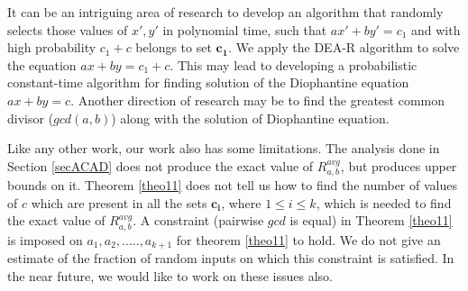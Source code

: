 \documentclass[pdflatex,sn-mathphys-num]{sn-jnl}%
\theoremstyle{thmstyleone}%
\theoremstyle{thmstyletwo}%
\theoremstyle{thmstylethree}%
\begin{document}
 \par It can be an intriguing area of research to develop an algorithm that randomly selects those values of $x',y'$ in polynomial time, such that $ax'+by'=c_1$ and with high probability $c_1+c$ belongs to set $\mathbf{c_1}$. We apply the DEA-R algorithm to solve the equation $ax+by=c_1+c$. This may lead to developing a probabilistic constant-time algorithm for finding solution of the Diophantine equation $ax+by=c$. Another direction of research may be to find the greatest common divisor ($gcd(a,b)$) along with the solution of  Diophantine equation.  

\par Like any other work, our work also has some limitations. The analysis done in Section \ref{secACAD} does not produce the exact value of $R_{a,b}^{avg}$, but produces upper bounds on it. Theorem \ref{theo11} does not tell us how to find the number of values of $c$ which are present in all the sets $\mathbf{c_i}$, where $1 \le i \le k$, which is needed to find the exact value of $R_{a,b}^{avg}$. 
A constraint (pairwise $gcd$ is equal) in Theorem \ref{theo11} is imposed on $a_1,a_2,.....,a_{k+1}$ for theorem \ref{theo11} to hold. We do not give an estimate of the fraction of random inputs on which this constraint is satisfied. In the near future, we would like to work on these issues also.







 






\end{document}
